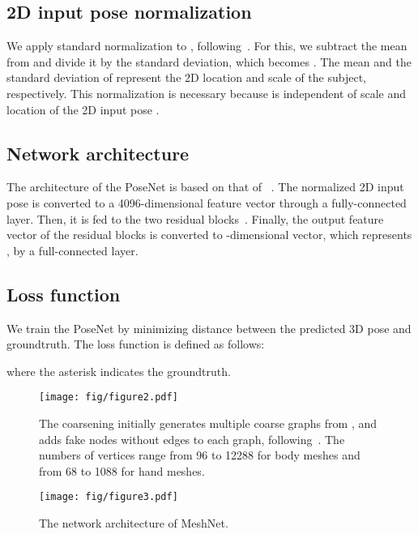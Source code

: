 \documentclass[runningheads]{llncs}
\begin{document}
\vspace{-3mm}
\subsection{2D input pose normalization}
We apply standard normalization to , following~\cite{wandt2019repnet,chang2020abs}.
For this, we subtract the mean from  and divide it by the standard deviation, which becomes .
The mean and the standard deviation of  represent the 
2D location and scale of the subject, respectively.
This normalization is necessary because  is independent of  scale and location of the 2D input pose .

\vspace{-3mm}
\subsection{Network architecture}
The architecture of the PoseNet is based on that of ~\cite{martinez2017simpyet,chang2020abs}.
The normalized 2D input pose  is converted to a 4096-dimensional feature vector through a fully-connected layer.
Then, it is fed to the two residual blocks~\cite{he2016res}.
Finally, the output feature vector of the residual blocks is converted to -dimensional vector, which represents , by a full-connected layer.

\subsection{Loss function}
We train the PoseNet by minimizing  distance between the predicted 3D pose  and groundtruth.
The loss function  is defined as follows:

where the asterisk indicates the groundtruth. \begin{figure}[t]
\centerline{
\texttt{[image: fig/figure2.pdf]}}
\caption
{
The coarsening initially generates multiple coarse graphs from , and adds fake nodes without edges to each graph, following~\cite{defferrard2016chebygcn}.
The numbers of vertices range from 96 to 12288 for body meshes and from 68 to 1088 for hand meshes.
}
\label{fig:coarsening}
\end{figure}

\begin{figure}[t]
\setlength\belowcaptionskip{-4ex}
\centerline{
\texttt{[image: fig/figure3.pdf]}}
\caption
{
The network architecture of MeshNet.
}
\label{fig:meshnet_architecture}
\end{figure}
\end{document}
